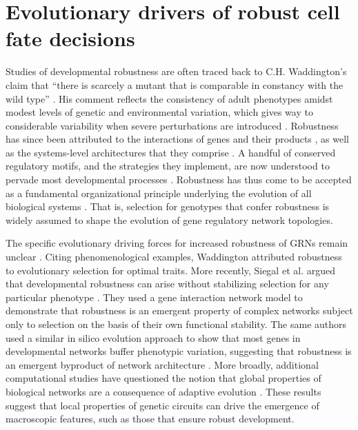 \section{Evolutionary drivers of robust cell fate decisions}

Studies of developmental robustness are often traced back to C.H. Waddington’s claim that “there is scarcely a mutant that is comparable in constancy with the wild type” \cite{Waddington1942}. His comment reflects the consistency of adult phenotypes amidst modest levels of genetic and environmental variation, which gives way to considerable variability when severe perturbations are introduced \cite{Bateman1959,Rendel1959,Rendel1966,Scharloo1991}. Robustness has since been attributed to the interactions of genes and their products \cite{Dun1958,Hogness1996,Rutherford1998}, as well as the systems-level architectures that they comprise \cite{Rutherford1998,Paulsen2011,Li2009,Eldar2002,Denby2012,Cassidy2013,Cassidy2016}. A handful of conserved regulatory motifs, and the strategies they implement, are now understood to pervade most developmental processes \cite{Freeman2000,Hartman2001,Alon2007,Marciano2014}. Robustness has thus come to be accepted as a fundamental organizational principle underlying the evolution of all biological systems \cite{Kitano2004}. That is, selection for genotypes that confer robustness is widely assumed to shape the evolution of gene regulatory network topologies. 

The specific evolutionary driving forces for increased robustness of GRNs remain unclear \cite{Siegal2014}. Citing phenomenological examples, Waddington attributed robustness to evolutionary selection for optimal traits. More recently, Siegal et al. argued that developmental robustness can arise without stabilizing selection for any particular phenotype \cite{Siegal2002}. They used a gene interaction network model to demonstrate that robustness is an emergent property of complex networks subject only to selection on the basis of their own functional stability. The same authors used a similar in silico evolution approach to show that most genes in developmental networks buffer phenotypic variation, suggesting that robustness is an emergent byproduct of network architecture \cite{Bergman2003}. More broadly, additional computational studies have questioned the notion that global properties of biological networks are a consequence of adaptive evolution \cite{Lynch2007,Wagner2003}. These results suggest that local properties of genetic circuits can drive the emergence of macroscopic features, such as those that ensure robust development.

